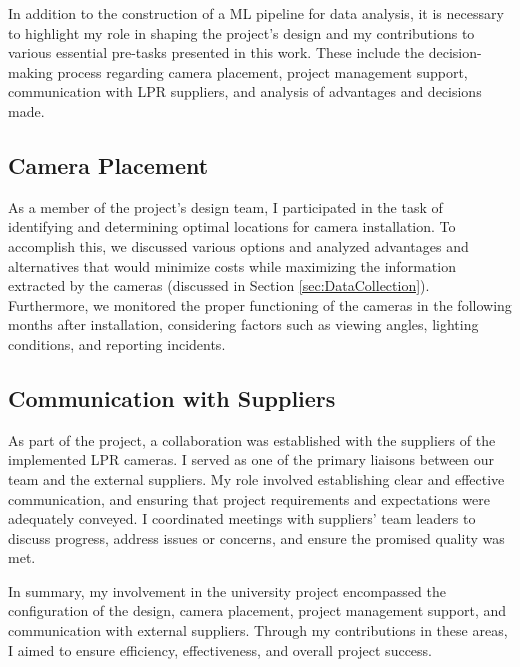 In addition to the construction of a ML pipeline for data analysis, it is necessary to highlight my role in shaping the project's design and my contributions to various essential pre-tasks presented in this work. These include the decision-making process regarding camera placement, project management support, communication with LPR suppliers, and analysis of advantages and decisions made.

\subsection*{Camera Placement}
As a member of the project's design team, I participated in the task of identifying and determining optimal locations for camera installation. To accomplish this, we discussed various options and analyzed advantages and alternatives that would minimize costs while maximizing the information extracted by the cameras (discussed in Section \ref{sec:DataCollection}). Furthermore, we monitored the proper functioning of the cameras in the following months after installation, considering factors such as viewing angles, lighting conditions, and reporting incidents.

\subsection*{Communication with Suppliers}
As part of the project, a collaboration was established with the suppliers of the implemented LPR cameras. I served as one of the primary liaisons between our team and the external suppliers. My role involved establishing clear and effective communication, and ensuring that project requirements and expectations were adequately conveyed. I coordinated meetings with suppliers' team leaders to discuss progress, address issues or concerns, and ensure the promised quality was met.

In summary, my involvement in the university project encompassed the configuration of the design, camera placement, project management support, and communication with external suppliers. Through my contributions in these areas, I aimed to ensure efficiency, effectiveness, and overall project success.
